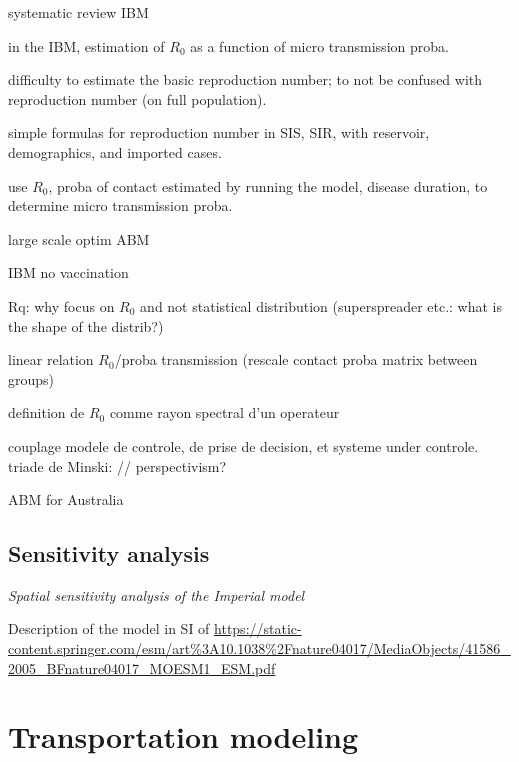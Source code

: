 \documentclass[10pt]{article}
\begin{document}
\cite{willem2017lessons} systematic review IBM

\cite{kuylen2017social} in the IBM, estimation of $R_0$ as a function of micro transmission proba.

\cite{delamater2019complexity} difficulty to estimate the basic reproduction number; to not be confused with reproduction number (on full population).

\cite{mclure2020some} simple formulas for reproduction number in SIS, SIR, with reservoir, demographics, and imported cases.

\cite{hunter2018open} use $R_0$, proba of contact estimated by running the model, disease duration, to determine micro transmission proba.

\cite{willem2015optimizing} large scale optim ABM  

\cite{kisjes2014individual} IBM no vaccination
	
Rq: why focus on $R_0$ and not statistical distribution (superspreader etc.: what is the shape of the distrib?)

\cite{chao2010flute} linear relation $R_0$/proba transmission (rescale contact proba matrix between groups)
	
\cite{bacaer2011parametre} definition de $R_0$ comme rayon spectral d'un operateur

\cite{bonte2011modelisation} couplage modele de controle, de prise de decision, et systeme under controle. triade de Minski: // perspectivism?

\cite{chang2020modelling} ABM for Australia

\cite{Nishi30285}

\subsection{Sensitivity analysis}

\textit{Spatial sensitivity analysis of the Imperial model}

Description of the model in SI of \cite{ferguson2005strategies}
\url{https://static-content.springer.com/esm/art\%3A10.1038\%2Fnature04017/MediaObjects/41586_2005_BFnature04017_MOESM1_ESM.pdf}


\cite{adam2020simulating}




\section{Transportation modeling}
\end{document}
